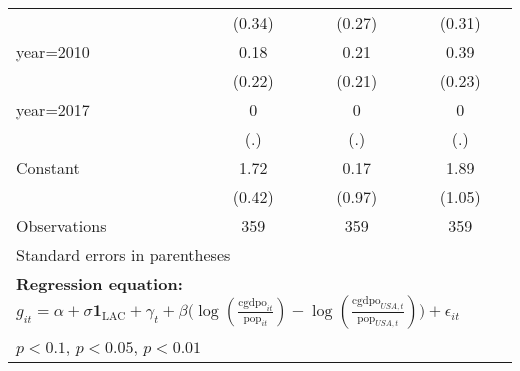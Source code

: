 \begin{sidewaystable}[htbp]
\begin{tabular}{l*{3}{c}}
                &   (0.34)         &   (0.27)         &   (0.31)         \\
\addlinespace
year=2010       &     0.18         &     0.21         &     0.39         \\
                &   (0.22)         &   (0.21)         &   (0.23)         \\
\addlinespace
year=2017       &        0         &        0         &        0         \\
                &      (.)         &      (.)         &      (.)         \\
\addlinespace
Constant        &     1.72\sym{***}&     0.17         &     1.89\sym{*}  \\
                &   (0.42)         &   (0.97)         &   (1.05)         \\
\midrule
Observations    &      359         &      359         &      359         \\
\bottomrule
\multicolumn{4}{l}{\footnotesize Standard errors in parentheses}\\
\multicolumn{4}{l}{\footnotesize \textbf{Regression equation:} \(g_{it} = \alpha + \sigma \mathbf{1}_{\textrm{LAC}} + \gamma_t + \beta \big(\log (\frac{\textrm{cgdpo}_{it}}{\textrm{pop}_{it}} ) - \log (\frac{\textrm{cgdpo}_{USA,t}}{\textrm{pop}_{USA,t}}  ) \big) + \epsilon_{it}\)}\\
\multicolumn{4}{l}{\footnotesize \sym{*} \(p<0.1\), \sym{**} \(p<0.05\), \sym{***} \(p<0.01\)}\\
\end{tabular}
\end{sidewaystable}

